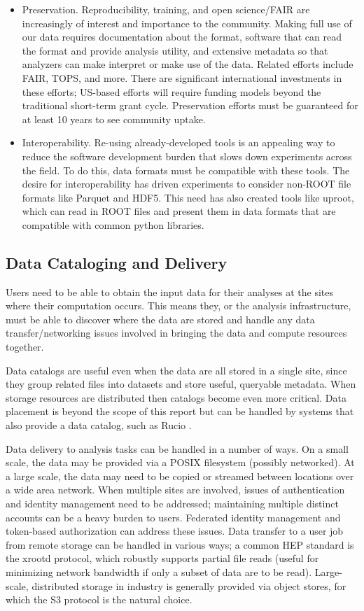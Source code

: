\begin{itemize}
  \item Preservation.  Reproducibility, training, and open science/FAIR are increasingly of interest and importance to the community.  Making full use of our data requires documentation about the format, software that can read the format and provide analysis utility, and extensive metadata so that analyzers can make interpret or make use of the data.  Related efforts include FAIR, TOPS, and more.  There are significant international investments in these efforts; US-based efforts will require funding models beyond the traditional short-term grant cycle.  Preservation efforts must be guaranteed for at least 10 years to see community uptake.
  \item Interoperability. Re-using already-developed tools is an appealing way to reduce the software development burden that slows down experiments across the field.  To do this, data formats must be compatible with these tools.  The desire for interoperability has driven experiments to consider non-ROOT file formats like Parquet and HDF5.  This need has also created tools like uproot, which can read in ROOT files and present them in data formats that are compatible with common python libraries.
\end{itemize} 


\subsection{Data Cataloging and Delivery}

Users need to be able to obtain the input data for their analyses at the sites where their computation occurs. This means they, or the analysis infrastructure, must be able to discover where the data are stored and handle any data transfer/networking issues involved in bringing the data and compute resources together.

Data catalogs are useful even when the data are all stored in a single site, since they group related files into datasets and store useful, queryable metadata. When storage resources are distributed then catalogs become even more critical. Data placement is beyond the scope of this report but can be handled by systems that also provide a data catalog, such as Rucio \cite{Barisits:2019fyl}.

Data delivery to analysis tasks can be handled in a number of ways. On a small scale, the data may be provided via a POSIX filesystem (possibly networked). At a large scale, the data may need to be copied or streamed between locations over a wide area network. When multiple sites are involved, issues of authentication and identity management need to be addressed; maintaining multiple distinct accounts can be a heavy burden to users. Federated identity management and token-based authorization can address these issues.  Data transfer to a user job from remote storage can be handled in various ways; a common HEP standard is the xrootd protocol, which robustly supports partial file reads (useful for minimizing network bandwidth if only a subset of data are to be read). Large-scale, distributed storage in industry is generally provided via object stores, for which the S3 protocol is the natural choice.

